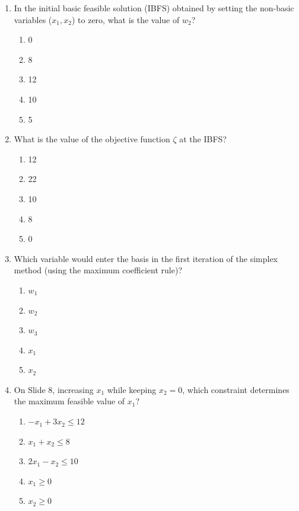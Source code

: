 \documentclass{article}%
\begin{document}
\begin{enumerate}
\begin{enumerate}
\begin{enumerate}
\item $w_1 = 12 - x_1 - 3x_2$%
\item $w_1 = -12 + x_1 - 3x_2$%
\item $w_1 = -12 - x_1 + 3x_2$%
\end{enumerate}%
\vspace{0.5em}%
\item In the initial basic feasible solution (IBFS) obtained by setting the non-basic variables ($x_1, x_2$) to zero, what is the value of $w_2$?%
\begin{enumerate}%
\item 0%
\item 8%
\item 12%
\item 10%
\item 5%
\end{enumerate}%
\vspace{0.5em}%
\item What is the value of the objective function $\zeta$ at the IBFS?%
\begin{enumerate}%
\item 12%
\item 22%
\item 10%
\item 8%
\item 0%
\end{enumerate}%
\vspace{0.5em}%
\item Which variable would enter the basis in the first iteration of the simplex method (using the maximum coefficient rule)?%
\begin{enumerate}%
\item $w_1$%
\item $w_2$%
\item $w_3$%
\item $x_1$%
\item $x_2$%
\end{enumerate}%
\vspace{0.5em}%
\item On Slide 8, increasing $x_1$ while keeping $x_2 = 0$, which constraint determines the maximum feasible value of $x_1$?%
\begin{enumerate}%
\item $-x_1 + 3x_2 \le 12$%
\item $x_1 + x_2 \le 8$%
\item $2x_1 - x_2 \le 10$%
\item $x_1 \ge 0$%
\item $x_2 \ge 0$%

\end{enumerate}
\end{enumerate}
\end{enumerate}
\end{document}
